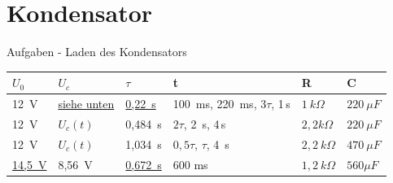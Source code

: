 \section{Kondensator}
\begin{frame}{Aufgaben - Laden des Kondensators}
  \subtitle{Lösungen}
  \label{AufgabenLadenC-Lsg}
\begin{tabular}{|l|l|l|l|l|l|}
 $U_0$  & $U_c$    & $\tau$    & t &            R &  C\\ \hline
 12\, V & \underline{siehe unten} & \underline{0,22\, s}  & 100\ ms, 220\ ms, $3\tau$, 1\,s  & $1\ k\Omega$ & $220\ \mu F$\\
 12\, V & $U_c(t)$ & 0,484\, s & $2\tau$, 2\, s, 4\,s  & \underline{$2,2k\Omega$} & $220\ \mu F$\\
 12\, V & $U_c(t)$ & 1,034\, s & $0,5\tau$, $\tau$, 4\, s & $2,2\ k\Omega$ & \underline{$470\ \mu F$} \\
 \underline{14,5\, V}& 8,56\, V & \underline{0,672\, s}& 600 ms & $1,2\ k\Omega$ & $560 \mu F$ \\
\end{tabular}
\end{frame}
